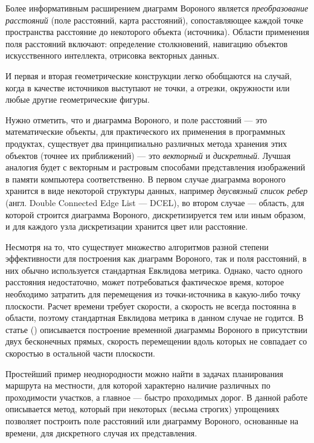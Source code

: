 \documentclass[12pt]{article}
\begin{document}
Более информативным расширением диаграмм Вороного является \emph{преобразование 
расстояний} (поле расстояний, карта расстояний), сопоставляющее каждой точке 
пространства расстояние до некоторого объекта (источника). Области применения 
поля расстояний включают: определение столкновений, навигацию объектов 
искусственного интеллекта, отрисовка векторных данных.

И первая и вторая геометрические конструкции легко обобщаются на случай, когда 
в качестве источников выступают не точки, а отрезки, окружности или любые другие
геометрические фигуры.

Нужно отметить, что и диаграмма Вороного, и поле расстояний --- это 
математические объекты, для практического их применения в программных 
продуктах, существует два принципиально различных метода хранения этих
объектов (точнее их приближений) --- это \emph{векторный} и \emph{дискретный}.
Лучшая аналогия будет с векторным и растровым способами представления 
изображений в памяти компьютера соответственно. В первом случае 
диаграмма вороного хранится в виде некоторой структуры данных, например 
\emph{двусвязный список ребер} (англ. Double Connected Edge List --- DCEL),
во втором случае --- область, для которой строится диаграмма Вороного, 
дискретизируется тем или иным образом, и для каждого узла дискретизации хранится
цвет или расстояние.

Несмотря на то, что существует множество алгоритмов разной степени 
эффективности для построения как диаграмм Вороного, так и поля расстояний,
в них обычно используется стандартная Евклидова метрика. Однако, часто одного
расстояния недостаточно, может потребоваться фактическое время, которое 
необходимо затратить для перемещения из точки-источника в какую-либо точку
плоскости. Расчет времени требует скорости, а скорость не всегда постоянна
в области, поэтому стандартная Евклидова метрика в данном случае не годится.
В статье (\cite{timeb}) описывается построение временной 
диаграммы Вороного в присутствии двух бесконечных прямых, скорость перемещении
вдоль которых не совпадает со скоростью в остальной части плоскости.

Простейший пример неоднородности можно найти в задачах планирования маршрута
на местности, для которой характерно наличие различных по проходимости участков,
а главное --- быстро проходимых дорог. В данной работе описывается метод, 
который при некоторых (весьма строгих) упрощениях позволяет построить 
поле расстояний или диаграмму Вороного, основанные на времени,
для дискретного случая их представления.
\end{document}
